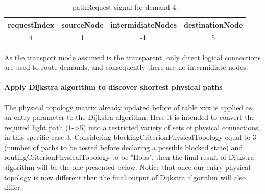 \begin{table}[H]
	\centering
	\begin{tabular}{|c|c|c|c|}
		\hline
		requestIndex & sourceNode & intermidiateNodes & destinationNode \\ \hline
		4            & 1          & -1                 & 5               \\ \hline
	\end{tabular}
	\caption{pathRequest signal for demand 4.}
\end{table} 

As the transport mode assumed is the transparent, only direct logical connections are used to route demands, and consequently there are no intermidiate nodes.\\ \\

\textbf{Apply Dijkstra algorithm to discover shortest physical paths}\\ \\
The physical topology matrix already updated before of table xxx is applied as an entry parameter to the Dijkstra algorithm. Here it is intended to convert the required light path (1->5) into a restricted variety of sets of physical connections, in this specific case 3. Considering blockingCriterionPhysicalTopology equal to 3 (number of paths to be tested before declaring a possible blocked state) and routingCriterionPhysicalTopology to be "Hops", then the final result of Dijkstra algorithm will be the one presented below. Notice that once our entry physical topology is now different then the final output of Dijkstra algorithm will also differ.



